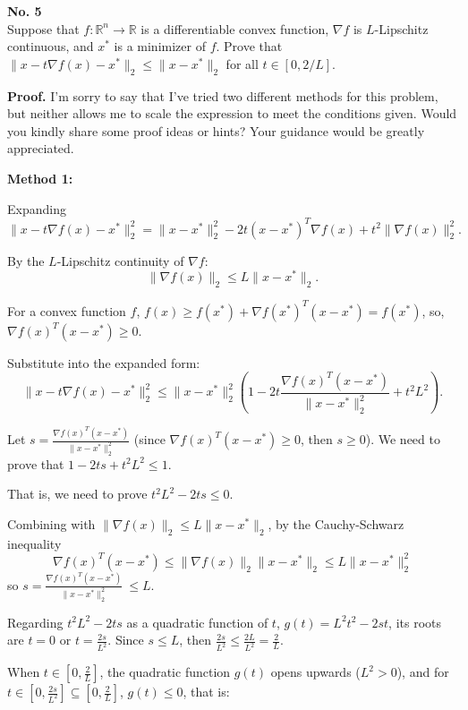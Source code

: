\documentclass[a4paper, 11pt]{article}
\newenvironment{problem}[2][No.]
    { \begin{mdframed}[backgroundcolor=gray!5] \textbf{#1 #2} \\}
    {  \end{mdframed}}
\newenvironment{solution}
    {\textbf{Proof.}}
    {}
\begin{document}
\begin{problem}{5}
	Suppose that \( f : \mathbb{R}^n \to \mathbb{R} \) is a differentiable convex function, \( \nabla f \) is \( L \)-Lipschitz continuous, and \( x^* \) is a minimizer of \( f \). Prove that \( \|x - t\nabla f(x) - x^*\|_2 \leq \|x - x^*\|_2 \) for all \( t \in [0, 2/L] \).
\end{problem}

\begin{solution}
	I'm sorry to say that I've tried two different methods for this problem, but neither allows me to scale the expression to meet the conditions given. Would you kindly share some proof ideas or hints? Your guidance would be greatly appreciated.
	
	\textbf{Method 1:}
	
	Expanding
$$
	\|x - t\nabla f(x) - x^*\|_2^2 = \|x - x^*\|_2^2 - 2t(x - x^*)^T\nabla f(x) + t^2\|\nabla f(x)\|_2^2.
$$

	By the \( L \)-Lipschitz continuity of \( \nabla f \):
$$
	\|\nabla f(x)\|_2 \leq L\|x - x^*\|_2.
$$

For a convex function \( f \),  \( f(x) \geq f(x^*) + \nabla f(x^*)^T (x - x^*) = f(x^*) \), so, \( \nabla f(x)^T (x - x^*) \geq 0 \).

Substitute into the expanded form: 
$$
\|x - t\nabla f(x) - x^*\|_2^2 \leq \|x - x^*\|_2^2 \left(1 - 2t\frac{\nabla f(x)^T (x - x^*)}{\|x - x^*\|_2^2} + t^2 L^2\right).
$$

Let \( s = \frac{\nabla f(x)^T (x - x^*)}{\|x - x^*\|_2^2} \) (since \( \nabla f(x)^T (x - x^*) \geq 0 \), then \( s \geq 0 \)). We need to prove that \( 1 - 2ts + t^2 L^2 \leq 1 \).

That is, we need to prove \( t^2 L^2 - 2ts \leq 0 \).

Combining with \( \|\nabla f(x)\|_2 \leq L \|x - x^*\|_2 \), by the Cauchy-Schwarz inequality
$$
\nabla f(x)^T (x - x^*) \leq \|\nabla f(x)\|_2 \|x - x^*\|_2 \leq L \|x - x^*\|_2^2
$$
so \( s =\frac{\nabla f(x)^T (x - x^*)}{\|x - x^*\|_2^2} \ \leq L \).

Regarding \( t^2 L^2 - 2ts \) as a quadratic function of \( t \), \( g(t) = L^2 t^2 - 2st \), its roots are \( t = 0 \) or \( t = \frac{2s}{L^2} \). Since \( s \leq L \), then \( \frac{2s}{L^2} \leq \frac{2L}{L^2} = \frac{2}{L} \).

When \( t \in [0, \frac{2}{L}] \), the quadratic function \( g(t) \) opens upwards (\( L^2 > 0 \)), and for \( t \in [0, \frac{2s}{L^2}] \subseteq [0, \frac{2}{L}] \), \( g(t) \leq 0 \), that is:


\end{solution}
\end{document}
